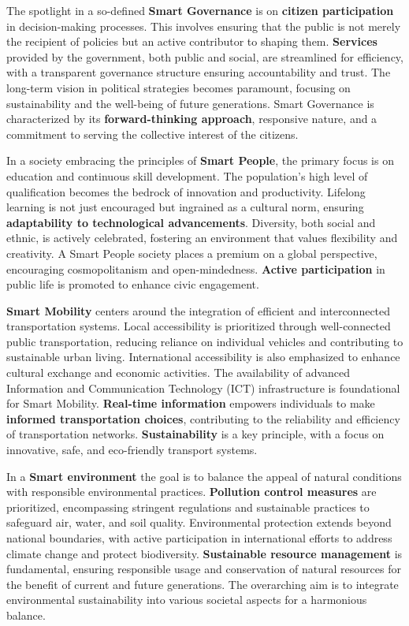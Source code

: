  
The spotlight in a so-defined \textbf{Smart Governance} is on \textbf{citizen participation} in decision-making processes. This involves ensuring that the public is not merely the recipient of policies but an active contributor to shaping them. \textbf{Services} provided by the government, both public and social, are streamlined for efficiency, with a transparent governance structure ensuring accountability and trust.
The long-term vision in political strategies becomes paramount, focusing on sustainability and the well-being of future generations. Smart Governance is characterized by its \textbf{forward-thinking approach}, responsive nature, and a commitment to serving the collective interest of the citizens.


In a society embracing the principles of \textbf{Smart People}, the primary focus is on education and continuous skill development. The population's high level of qualification becomes the bedrock of innovation and productivity. Lifelong learning is not just encouraged but ingrained as a cultural norm, ensuring \textbf{adaptability to technological advancements}. Diversity, both social and ethnic, is actively celebrated, fostering an environment that values flexibility and creativity. A Smart People society places a premium on a global perspective, encouraging cosmopolitanism and open-mindedness. \textbf{Active participation} in public life is promoted to enhance civic engagement.

    
\textbf{Smart Mobility} centers around the integration of efficient and interconnected transportation systems. Local accessibility is prioritized through well-connected public transportation, reducing reliance on individual vehicles and contributing to sustainable urban living. International accessibility is also emphasized to enhance cultural exchange and economic activities.
The availability of advanced Information and Communication Technology (ICT) infrastructure is foundational for Smart Mobility. \textbf{Real-time information} empowers individuals to make \textbf{informed transportation choices}, contributing to the reliability and efficiency of transportation networks. \textbf{Sustainability} is a key principle, with a focus on innovative, safe, and eco-friendly transport systems.

 
In a \textbf{Smart environment} the goal is to balance the appeal of natural conditions with responsible environmental practices. \textbf{Pollution control measures} are prioritized, encompassing stringent regulations and sustainable practices to safeguard air, water, and soil quality.
Environmental protection extends beyond national boundaries, with active participation in international efforts to address climate change and protect biodiversity. \textbf{Sustainable resource management} is fundamental, ensuring responsible usage and conservation of natural resources for the benefit of current and future generations. The overarching aim is to integrate environmental sustainability into various societal aspects for a harmonious balance.
    
